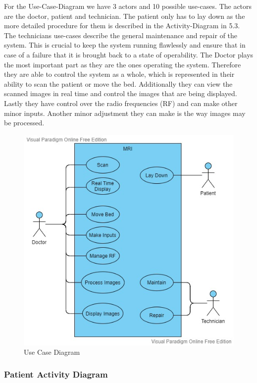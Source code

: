 \documentclass[conference]{IEEEtran}
\begin{document}
    For the Use-Case-Diagram we have 3 actors and 10 possible use-cases. The actors are the doctor, patient and technician.
    The patient only has to lay down as the more detailed procedure for them is described in the Activity-Diagram in 5.3.
    The technicians use-cases describe the general maintenance and repair of the system. This is crucial to keep the system running flawlessly and ensure that in case of a failure that it is brought back to a state of operability.
    The Doctor plays the most important part as they are the ones operating the system. Therefore they are able to control the system as a whole, which is represented in their ability to scan the patient or move the bed. Additionally they can view the scanned images in real time and control the images that are being displayed. Lastly they have control over the radio frequencies (RF) and can make other minor inputs. Another minor adjustment they can make is the way images may be processed.
    
    \begin{figure}[htbp]
    \centerline{\includegraphics[scale = 0.5]{Pictures/mri_usecase.jpg}}
    \caption{Use Case Diagram}
    \label{usecase}
    \end{figure}
    
    \subsubsection{Patient Activity Diagram}
    
\end{document}
